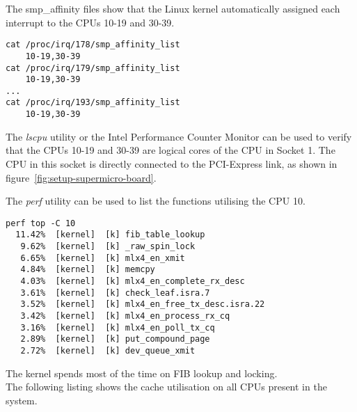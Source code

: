 The smp\_affinity files show that the Linux kernel
automatically assigned each interrupt to the CPUs 10-19 and 30-39.
\begin{lstlisting}
cat /proc/irq/178/smp_affinity_list
	10-19,30-39
cat /proc/irq/179/smp_affinity_list
	10-19,30-39
...
cat /proc/irq/193/smp_affinity_list
	10-19,30-39
\end{lstlisting}
The {\it{lscpu}} utility or the Intel Performance Counter Monitor can be used to
verify that the CPUs 10-19 and 30-39 are logical cores of the CPU in Socket 1.
The CPU in this socket is directly connected to the PCI-Express link, as shown in figure~\ref{fig:setup-supermicro-board}.

The {\it{perf}} utility can be used to list the functions utilising the CPU 10.
\begin{lstlisting}
perf top -C 10
  11.42%  [kernel]  [k] fib_table_lookup
   9.62%  [kernel]  [k] _raw_spin_lock
   6.65%  [kernel]  [k] mlx4_en_xmit
   4.84%  [kernel]  [k] memcpy
   4.03%  [kernel]  [k] mlx4_en_complete_rx_desc
   3.61%  [kernel]  [k] check_leaf.isra.7
   3.52%  [kernel]  [k] mlx4_en_free_tx_desc.isra.22
   3.42%  [kernel]  [k] mlx4_en_process_rx_cq
   3.16%  [kernel]  [k] mlx4_en_poll_tx_cq
   2.89%  [kernel]  [k] put_compound_page
   2.72%  [kernel]  [k] dev_queue_xmit
\end{lstlisting}
The kernel spends most of the time on FIB lookup and locking.
\\
The following listing shows the cache utilisation on all CPUs present in the system.
